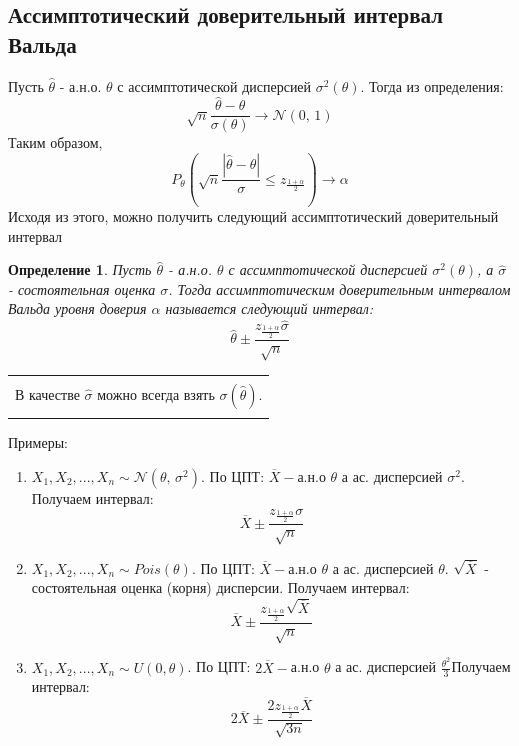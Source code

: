 \documentclass[a4paper,12pt]{article}
\newcommand{\normal}[2]{\mathcal{N}(#1,\,#2)}
\newcommand{\sample}{X_1, X_2, ..., X_n}
\newenvironment{annotation}{\begin{center}
    \begin{tabular}{|p{0.9\textwidth}|}
    \hline\\
}
{ 
    \\\\\hline
    \end{tabular} 
    \end{center}
}
\newtheorem{dfn}{Определение}[section]
\theoremstyle{named}
\begin{document}
\subsection{Ассимптотический доверительный интервал Вальда}
Пусть $\hat\theta$ - а.н.о. $\theta$ с ассимптотической дисперсией $\sigma^2(\theta)$. Тогда из определения:
$$
    \sqrt{n}\frac{\hat\theta - \theta}{\sigma(\theta)} \to \normal{0}{1}
$$
Таким образом, 
$$
    P_\theta(\sqrt{n}\frac{|\hat\theta - \theta|}{\sigma} \leq z_{\frac{1+\alpha}{2}}) \to \alpha
$$
Исходя из этого, можно получить следующий ассимптотический доверительный интервал
\begin{dfn}
    Пусть $\hat\theta$ - а.н.о. $\theta$ с ассимптотической дисперсией $\sigma^2(\theta)$, а $\hat\sigma$ - состоятельная оценка $\sigma$. 
    Тогда ассимптотическим доверительным интервалом Вальда уровня доверия $\alpha$ называется следующий интервал:
    $$
        \hat\theta \pm \frac{z_{\frac{1+\alpha}{2}}\hat\sigma}{\sqrt{n}}
    $$  
\end{dfn}
\begin{annotation}
    В качестве $\hat\sigma$ можно всегда взять $\sigma(\hat\theta)$.
\end{annotation}
Примеры:
\begin{enumerate}
    \item $\sample \sim \normal{\theta}{\sigma^2}$. По ЦПТ: $\overline{X} - $а.н.о $\theta$ а ас. дисперсией $\sigma^2$. Получаем интервал:
    $$
        \overline{X} \pm \frac{z_{\frac{1+\alpha}{2}}\sigma}{\sqrt{n}}
    $$
    \item $\sample \sim Pois(\theta)$. По ЦПТ: $\overline{X} - $а.н.о $\theta$ а ас. дисперсией $\theta$. $\sqrt{\overline{X}}$ - состоятельная оценка 
    (корня) дисперсии. Получаем интервал:
    $$
        \overline{X} \pm \frac{z_{\frac{1+\alpha}{2}}\sqrt{\overline{X}}}{\sqrt{n}}
    $$
    \item $\sample \sim U(0, \theta)$. По ЦПТ: $2\overline{X} - $а.н.о $\theta$ а ас. дисперсией $\frac{\theta^2}{3}$Получаем интервал:
    $$
        2\overline{X} \pm \frac{2z_{\frac{1+\alpha}{2}}\overline{X}}{\sqrt{3n}}
    $$
\end{enumerate}
\end{document}
